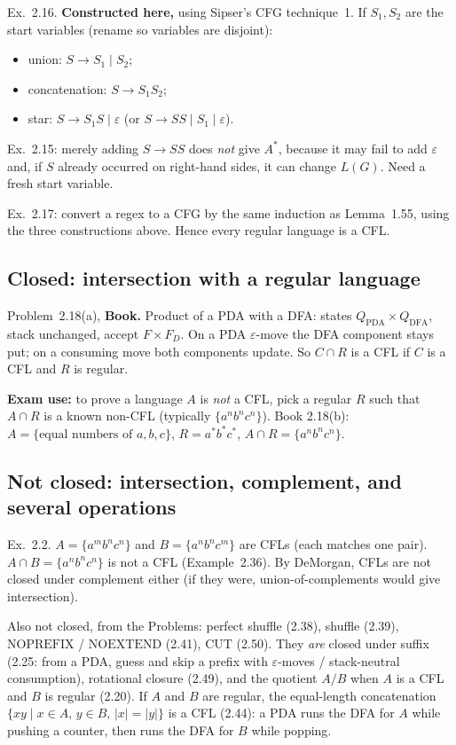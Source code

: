 \documentclass[11pt,a4paper]{article}
\newcommand{\eps}{\varepsilon}
\begin{document}
Ex.~2.16. \textbf{Constructed here,} using Sipser's CFG technique~1.
If $S_1,S_2$ are the start variables (rename so variables are
disjoint):
\begin{itemize}[nosep]
  \item union: $S\to S_1\mid S_2$;
  \item concatenation: $S\to S_1S_2$;
  \item star: $S\to S_1S\mid\eps$ (or $S\to SS\mid S_1\mid\eps$).
\end{itemize}
Ex.~2.15: merely adding $S\to SS$ does \emph{not} give $A^*$, because
it may fail to add $\eps$ and, if $S$ already occurred on
right-hand sides, it can change $L(G)$. Need a fresh start variable.

Ex.~2.17: convert a regex to a CFG by the same induction as
Lemma~1.55, using the three constructions above. Hence every regular
language is a CFL.

\subsection{Closed: intersection with a regular language}

Problem~2.18(a), \textbf{Book.} Product of a PDA with a DFA: states
$Q_{\mathrm{PDA}}\times Q_{\mathrm{DFA}}$, stack unchanged, accept
$F\times F_D$. On a PDA $\eps$-move the DFA component stays put; on
a consuming move both components update. So $C\cap R$ is a CFL if
$C$ is a CFL and $R$ is regular.

\textbf{Exam use:} to prove a language $A$ is \emph{not} a CFL, pick
a regular $R$ such that $A\cap R$ is a known non-CFL
(typically $\{a^nb^nc^n\}$). Book 2.18(b):
$A=\{\text{equal numbers of }a,b,c\}$, $R=a^*b^*c^*$,
$A\cap R=\{a^nb^nc^n\}$.

\subsection{Not closed: intersection, complement, and several operations}

Ex.~2.2. $A=\{a^mb^nc^n\}$ and $B=\{a^nb^nc^m\}$ are CFLs (each
matches one pair). $A\cap B=\{a^nb^nc^n\}$ is not a CFL
(Example~2.36). By DeMorgan, CFLs are not closed under complement
either (if they were, union-of-complements would give intersection).

Also not closed, from the Problems:
perfect shuffle (2.38), shuffle (2.39), $\mathrm{NOPREFIX}$ /
$\mathrm{NOEXTEND}$ (2.41), $\mathrm{CUT}$ (2.50). They \emph{are}
closed under suffix (2.25: from a PDA, guess and skip a prefix
with $\eps$-moves / stack-neutral consumption), rotational
closure (2.49), and the quotient $A/B$ when $A$ is a CFL and $B$
is regular (2.20). If $A$ and $B$ are regular, the equal-length
concatenation $\{xy\mid x\in A,\,y\in B,\,|x|=|y|\}$ is a CFL
(2.44): a PDA runs the DFA for $A$ while pushing a counter, then
runs the DFA for $B$ while popping.
\end{document}

